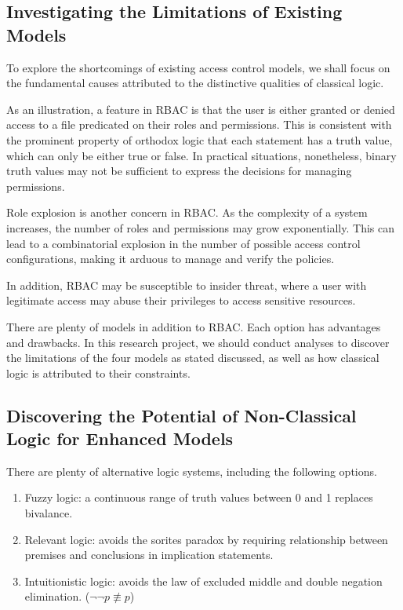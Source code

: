 \documentclass{article}
\begin{document}
\subsection*{Investigating the Limitations of Existing Models}

To explore the shortcomings of existing access control models, we shall focus on the fundamental causes attributed to the distinctive qualities of classical logic.

As an illustration, a feature in RBAC is that the user is either granted or denied access to a file predicated on their roles and permissions. This is consistent with the prominent property of orthodox logic that each statement has a truth value, which can only be either true or false. In practical situations, nonetheless, binary truth values may not be sufficient to express the decisions for managing permissions.

Role explosion is another concern in RBAC. As the complexity of a system increases, the number of roles and permissions may grow exponentially. This can lead to a combinatorial explosion in the number of possible access control configurations, making it arduous to manage and verify the policies.\cite{role-explosion}

In addition, RBAC may be susceptible to insider threat, where a user with legitimate access may abuse their privileges to access sensitive resources.\cite{insider-threat}

There are plenty of models in addition to RBAC. Each option has advantages and drawbacks. In this research project, we should conduct analyses to discover the limitations of the four models as stated discussed, as well as how classical logic is attributed to their constraints.

\subsection*{Discovering the Potential of Non-Classical Logic for Enhanced Models}

There are plenty of alternative logic systems, including the following options.
\begin{enumerate}
    \item Fuzzy logic: a continuous range of truth values between 0 and 1 replaces bivalance.\cite{fuzzy}
    \item Relevant logic: avoids the sorites paradox by requiring relationship between premises and conclusions in implication statements.\cite{relevant}
    \item Intuitionistic logic: avoids the law of excluded middle and double negation elimination. ($\neg\neg p \not\equiv p$)\cite{intuitionistic}
\end{enumerate}
\end{document}
